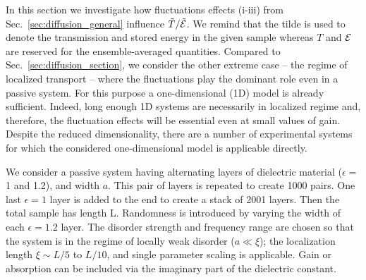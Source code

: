 In this section we investigate how fluctuations effects (i-iii) from Sec.~\ref{sec:diffusion_general} influence $\tilde{T}/\tilde{\cal E}$. We remind that the tilde is used to denote the transmission and stored energy in the given sample whereas $T$ and ${\cal E}$ are reserved for the ensemble-averaged quantities. Compared to Sec.~\ref{sec:diffusion_section}, we consider the other extreme case -- the regime of localized transport -- where the fluctuations play the dominant role even in a passive system. For this purpose a one-dimensional (1D) model is already sufficient. Indeed, long enough 1D systems are necessarily in localized regime and, therefore, the fluctuation effects will be essential even at small values of gain. Despite the reduced dimensionality, there are a number of experimental systems \cite{2006_Genack_1d,2006_Scales,2008_LunaAcosta,2005_Genack_Milner} for which the considered one-dimensional model is applicable directly.

We consider a passive system having alternating layers of dielectric material ($\epsilon =$ 1 and 1.2), and width $a$. %
This pair of layers is repeated to create 1000 pairs. One last $\epsilon = 1$ layer is added to the end to create a stack of 2001 layers. Then the total sample has length L. Randomness is introduced by varying the width of each $\epsilon=1.2$ layer. The disorder strength and frequency range are chosen so that the system is in the regime of locally weak disorder ($a\ll\xi$); the localization length $\xi\sim L/5$ to $L/10$, and single parameter scaling is applicable\cite{2000_Deych_sps}. Gain or absorption can be included via the imaginary part of the dielectric constant.

